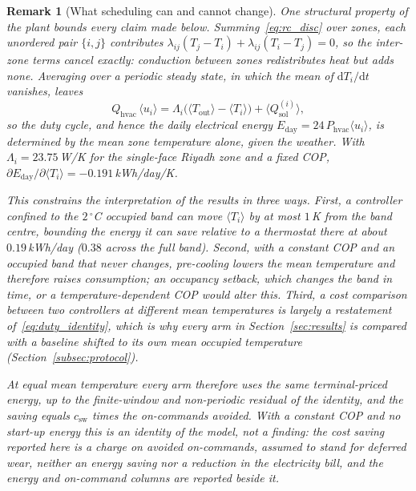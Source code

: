 \documentclass[pdflatex,sn-mathphys-num,iicol]{sn-jnl}
\theoremstyle{thmstyleone}\newtheorem{proposition}{Proposition}\newtheorem{corollary}{Corollary}
\theoremstyle{thmstyletwo}\newtheorem{remark}{Remark}\newtheorem{observation}{Observation}
\theoremstyle{thmstylethree}\newtheorem{definition}{Definition}
\newcommand{\Tout}{T_{\mathrm{out}}}
\newcommand{\lij}{\lambda_{ij}}
\newcommand{\Qhvac}{Q_{\mathrm{hvac}}}
\newcommand{\csw}{c_{\mathrm{sw}}}
\newcommand{\Phvac}{P_{\mathrm{hvac}}}
\begin{document}
\begin{remark}[What scheduling can and cannot change]
\label{rem:energy_identity}
One structural property of the plant bounds every claim made below. Summing~\eqref{eq:rc_disc} over zones, each unordered pair $\{i,j\}$ contributes $\lij(T_j-T_i)+\lij(T_i-T_j)=0$, so the inter-zone terms cancel exactly: conduction between zones redistributes heat but adds none. Averaging over a periodic steady state, in which the mean of $\mathrm{d}T_i/\mathrm{d}t$ vanishes, leaves
\begin{equation}
  \Qhvac\,\langle u_i\rangle=\Lambda_i\bigl(\langle\Tout\rangle-\langle T_i\rangle\bigr)+\langle Q_{\mathrm{sol}}^{(i)}\rangle,
  \label{eq:duty_identity}
\end{equation}
so the duty cycle, and hence the daily electrical energy $E_{\mathrm{day}}=24\,\Phvac\langle u_i\rangle$, is determined by the mean zone temperature alone, given the weather. With $\Lambda_i=23.75\,$W/K for the single-face Riyadh zone and a fixed COP, $\partial E_{\mathrm{day}}/\partial\langle T_i\rangle=-0.191\,$kWh/day/K.

This constrains the interpretation of the results in three ways. First, a controller confined to the $2\,^\circ$C occupied band can move $\langle T_i\rangle$ by at most $1\,$K from the band centre, bounding the energy it can save relative to a thermostat there at about $0.19\,$kWh/day ($0.38$ across the full band). Second, with a constant COP and an occupied band that never changes, pre-cooling \emph{lowers} the mean temperature and therefore \emph{raises} consumption; an occupancy setback, which changes the band in time, or a temperature-dependent COP would alter this. Third, a cost comparison between two controllers at different mean temperatures is largely a restatement of~\eqref{eq:duty_identity}, which is why every arm in Section~\ref{sec:results} is compared with a baseline shifted to its own mean occupied temperature (Section~\ref{subsec:protocol}).

At equal mean temperature every arm therefore uses the same terminal-priced energy, up to the finite-window and non-periodic residual of the identity, and the saving equals $\csw$ times the on-commands avoided. With a constant COP and no start-up energy this is an identity of the model, not a finding: the cost saving reported here is a charge on avoided on-commands, assumed to stand for deferred wear, neither an energy saving nor a reduction in the electricity bill, and the energy and on-command columns are reported beside it.
\end{remark}
\end{document}
